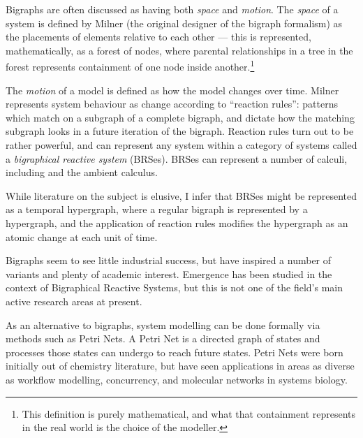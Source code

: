 \documentclass[draft]{report}
\begin{document}
Bigraphs are often discussed as having both \emph{space} and
\emph{motion}\cite{milner2009space}. The \emph{space} of a system is defined by
Milner (the original designer of the bigraph formalism) as the placements of
elements relative to each other --- this is represented, mathematically, as a
forest of nodes, where parental relationships in a tree in the forest represents
containment of one node inside another.\footnote{This definition is purely
  mathematical, and what that containment represents in the real world is the
  choice of the modeller.}\par

The \emph{motion} of a model is defined as how the model changes over time.
Milner represents system behaviour as change according to ``reaction rules'':
patterns which match on a subgraph of a complete bigraph, and dictate how the
matching subgraph looks in a future iteration of the bigraph. Reaction rules
turn out to be rather powerful, and can represent any system within a category
of systems called a \emph{bigraphical reactive
  system}\cite{milner_early_brs_definition} (BRSes). BRSes can represent a
number of calculi, including \picalculus and the ambient
calculus\cite{bigraphs_and_transitions_milner_jensen}.\par

While literature on the
subject is elusive, I infer that BRSes might
be represented as a temporal hypergraph, where a regular bigraph is represented
by a hypergraph, and the application of reaction rules modifies the hypergraph
as an atomic change at each unit of time.\par

Bigraphs seem to see little industrial success, but have inspired a number of
variants\cite{bigraphs_with_sharing,directed_bigraphs} and plenty of academic
interest\cite{impalas_stevegnani,bigraph_model_checking,bigraph_languages}.
Emergence has been studied in the context of Bigraphical Reactive Systems\cite{bigraph_emergence}, but
this is not one of the field's main active research areas at present.


\label{subsubsec:petrinets}
As an alternative to bigraphs, system modelling can be done formally via methods
such as Petri Nets\cite{petri_net_seminal}. A Petri Net is a directed graph of
states and processes those states can undergo to reach future states. Petri Nets
were born initially out of chemistry literature\cite{petri_net_seminal}, but
have seen applications in areas as diverse as workflow
modelling\cite{petri_net_workflow_modelling},
concurrency\cite{petri_net_concurrency}, and molecular networks in systems
biology\cite{petri_nets_for_biology}.\par
\end{document}
